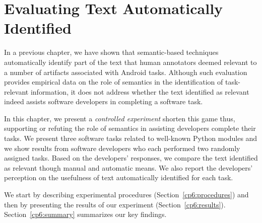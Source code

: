 \setcounter{chapter}{5}
\setcounter{rq}{1}


\chapter{Evaluating Text Automatically Identified}
\label{ch:assisting}







In a previous chapter, we have shown that semantic-based techniques automatically identify part of the text 
that human annotators deemed relevant to a number of artifacts associated with Android tasks.
Although such evaluation provides empirical data on the role of semantics in the identification of task-relevant information, it does not address whether the text identified as relevant indeed assists software developers in completing a software task.



In this chapter, we present a \textit{controlled experiment} shorten this game thus, supporting or refuting the role of semantics in assisting developers complete their tasks. 
We present three software tasks related to well-known Python modules and we show 
results from  software developers who each performed two randomly assigned tasks. 
Based on the developers' responses, we compare the text identified as relevant though manual 
and automatic means. We also report the developers' perception on the usefulness of text automatically identified for each task. 


We start by describing experimental procedures (Section~\ref{cp6:procedures}) and then by presenting the results of our experiment (Section~\ref{cp6:results}). Section~\ref{cp6:summary} summarizes our key findings.






